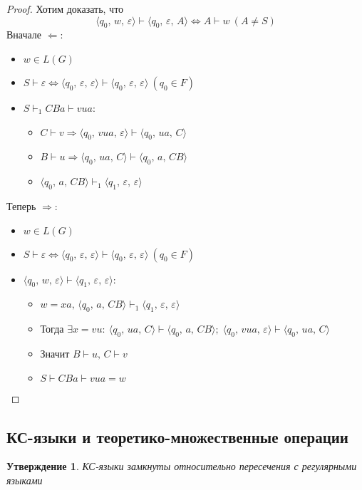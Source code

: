 \documentclass[a4paper,12pt]{article}
\theoremstyle{plain}
\newtheorem{proposition}{Утверждение}[subsection]
\theoremstyle{definition}
\theoremstyle{remark}
\begin{document}
\begin{proof}
	Хотим доказать, что
	\[
		\langle q_0,\, w,\, \varepsilon\rangle\vdash\langle q_0,\, \varepsilon,\, A\rangle \Leftrightarrow A \vdash w \: (A \neq S)
	\]
	Вначале $\Leftarrow$:
	\begin{itemize}
		\item $w \in L(G)$
		\item $S \vdash \varepsilon \Leftrightarrow \langle q_0,\, \varepsilon,\, \varepsilon\rangle \vdash\langle q_0,\, \varepsilon,\, \varepsilon\rangle \: (q_0 \in F)$
		\item $S \vdash_1 CBa \vdash vua$:
		      \begin{itemize}
			      \item $C \vdash v \Rightarrow \langle q_0,\, vua,\, \varepsilon\rangle \vdash \langle q_0,\, ua,\, C\rangle$
			      \item $B \vdash u \Rightarrow \langle q_0,\, ua,\, C\rangle \vdash \langle q_0,\, a,\, CB\rangle$
			      \item $\langle q_0,\, a,\, CB\rangle \vdash_1\langle q_1,\, \varepsilon,\, \varepsilon\rangle$
		      \end{itemize}
	\end{itemize}
	Теперь $\Rightarrow$:
	\begin{itemize}
		\item $w \in L(G)$
		\item $S \vdash \varepsilon \Leftrightarrow \langle q_0,\, \varepsilon,\, \varepsilon\rangle \vdash\langle q_0,\, \varepsilon,\, \varepsilon\rangle \: (q_0 \in F)$
		\item $\langle q_0,\, w,\, \varepsilon\rangle\vdash\langle q_1,\, \varepsilon,\, \varepsilon\rangle$:
		      \begin{itemize}
			      \item $w = xa,\, \langle q_0,\, a,\, CB\rangle \vdash_1\langle q_1,\, \varepsilon,\, \varepsilon\rangle$
			      \item Тогда $\exists x = vu :\: \langle q_0,\, ua,\, C\rangle \vdash\langle q_0,\, a,\, CB\rangle;\; \langle q_0,\, vua,\, \varepsilon\rangle \vdash \langle q_0,\, ua,\, C\rangle$
			      \item Значит $B \vdash u,\, C \vdash v$
			      \item $S \vdash CBa \vdash vua = w$
		      \end{itemize}
	\end{itemize}
\end{proof}

\subsection{КС-языки и теоретико-множественные операции}
\begin{proposition}
	КС-языки замкнуты относительно пересечения с регулярными языками
\end{proposition}
\end{document}
